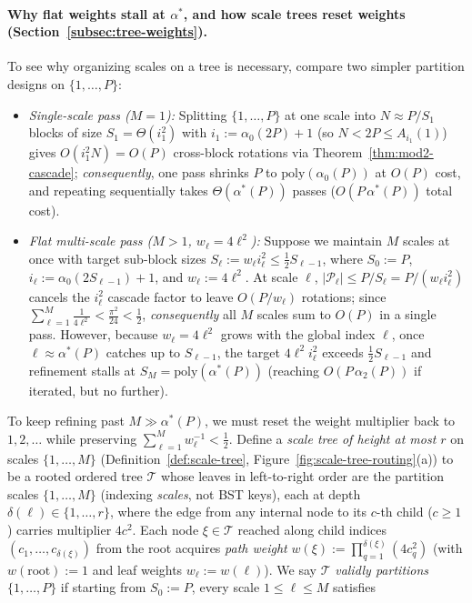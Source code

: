 \documentclass[11pt]{article}
\theoremstyle{definition}
\theoremstyle{remark}
\begin{document}
\paragraph{Why flat weights stall at $\alpha^*$, and how scale trees reset weights (Section~\ref{subsec:tree-weights}).}
To see why organizing scales on a tree is necessary, compare two simpler partition designs on $\{1, \dots, P\}$:
\begin{itemize}[leftmargin=2em, itemsep=2pt]
  \item \emph{Single-scale pass ($M = 1$):} Splitting $\{1, \dots, P\}$ at one scale into $N \approx P / S_1$ blocks of size $S_1 = \Theta(i_1^2)$ with $i_1 := \alpha_0(2P) + 1$ (so $N < 2P \le A_{i_1}(1)$) gives $O(i_1^2 N) = O(P)$ cross-block rotations via Theorem~\ref{thm:mod2-cascade}; \emph{consequently}, one pass shrinks $P$ to $\mathrm{poly}(\alpha_0(P))$ at $O(P)$ cost, and repeating sequentially takes $\Theta(\alpha^*(P))$ passes ($O(P\,\alpha^*(P))$ total cost).
  \item \emph{Flat multi-scale pass ($M > 1$, $w_\ell = 4\ell^2$):} Suppose we maintain $M$ scales at once with target sub-block sizes $S_\ell := w_\ell i_\ell^2 \le \frac{1}{2} S_{\ell-1}$, where $S_0 := P$, $i_\ell := \alpha_0(2 S_{\ell-1}) + 1$, and $w_\ell := 4\ell^2$. At scale $\ell$, $|\mathcal{P}_\ell| \le P / S_\ell = P / (w_\ell i_\ell^2)$ cancels the $i_\ell^2$ cascade factor to leave $O(P / w_\ell)$ rotations; since $\sum_{\ell=1}^M \frac{1}{4\ell^2} < \frac{\pi^2}{24} < \frac{1}{2}$, \emph{consequently} all $M$ scales sum to $O(P)$ in a single pass. However, because $w_\ell = 4\ell^2$ grows with the global index $\ell$, once $\ell \approx \alpha^*(P)$ catches up to $S_{\ell-1}$, the target $4\ell^2 i_\ell^2$ exceeds $\frac{1}{2} S_{\ell-1}$ and refinement stalls at $S_M = \mathrm{poly}(\alpha^*(P))$ (reaching $O(P\,\alpha_2(P))$ if iterated, but no further).
\end{itemize}
To keep refining past $M \gg \alpha^*(P)$, we must reset the weight multiplier back to $1, 2, \dots$ while preserving $\sum_{\ell=1}^M w_\ell^{-1} < \frac{1}{2}$. Define a \emph{scale tree of height at most $r$} on scales $\{1, \dots, M\}$ (Definition~\ref{def:scale-tree}, Figure~\ref{fig:scale-tree-routing}(a)) to be a rooted ordered tree $\mathcal{T}$ whose leaves in left-to-right order are the partition scales $\{1, \dots, M\}$ (indexing \emph{scales}, not BST keys), each at depth $\delta(\ell) \in \{1, \dots, r\}$, where the edge from any internal node to its $c$-th child ($c \ge 1$) carries multiplier $4 c^2$. Each node $\xi \in \mathcal{T}$ reached along child indices $(c_1, \dots, c_{\delta(\xi)})$ from the root acquires \emph{path weight} $w(\xi) := \prod_{q=1}^{\delta(\xi)} (4 c_q^2)$ (with $w(\mathrm{root}) := 1$ and leaf weights $w_\ell := w(\ell)$). We say $\mathcal{T}$ \emph{validly partitions} $\{1, \dots, P\}$ if starting from $S_0 := P$, every scale $1 \le \ell \le M$ satisfies
\end{document}
